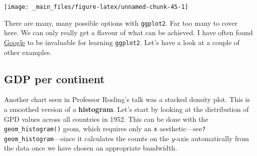 \documentclass[]{book}
\newenvironment{Shaded}{\begin{snugshade}}{\end{snugshade}}
\newcommand{\KeywordTok}[1]{\textcolor[rgb]{0.13,0.29,0.53}{\textbf{{#1}}}}
\newcommand{\DataTypeTok}[1]{\textcolor[rgb]{0.13,0.29,0.53}{{#1}}}
\newcommand{\DecValTok}[1]{\textcolor[rgb]{0.00,0.00,0.81}{{#1}}}
\newcommand{\StringTok}[1]{\textcolor[rgb]{0.31,0.60,0.02}{{#1}}}
\newcommand{\NormalTok}[1]{{#1}}
\theoremstyle{definition}
\theoremstyle{definition}
\theoremstyle{definition}
\theoremstyle{remark}
\begin{document}
\begin{Shaded}
\end{Shaded}

\begin{center}\texttt{[image: \_main\_files/figure-latex/unnamed-chunk-45-1]} \end{center}

There are many, many possible options with \texttt{ggplot2}. Far too
many to cover here. We can only really get a flavour of what can be
achieved. I have often found \href{www.google.com}{Google} to be
invaluable for learning \texttt{ggplot2}. Let's have a look at a couple
of other examples.

\subsection{GDP per continent}\label{gdp-per-continent}

Another chart seen in Professor Rosling's talk was a stacked density
plot. This is a smoothed version of a \textbf{histogram}. Let's start by
looking at the distribution of GPD values across all countries in 1952.
This can be done with the \texttt{geom\_histogram()} geom, which
requires only an \texttt{x}
aesthetic---see\texttt{?geom\_histogram}---since it calculates the
counts on the \(y\)-axis automatically from the data once we have chosen
an appropriate bandwidth.
\end{document}

